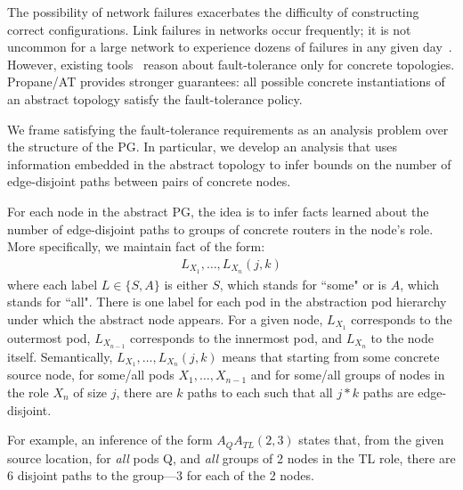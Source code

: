 \documentclass[numbers, 10pt, preprint]{sigplanconf}
\newcommand{\sysname}{{\text{}\small \sf Propane/AT}\xspace}
\begin{document}

The possibility of network failures exacerbates the difficulty of constructing correct configurations.
Link failures in networks occur frequently; it is not uncommon for a large network to experience dozens of failures in any given day~\cite{dc-failure-study}. However, existing tools~\cite{condor,propane} reason about fault-tolerance only for concrete topologies. \sysname provides stronger guarantees: all possible concrete instantiations of an abstract topology satisfy the fault-tolerance policy.


%
We frame satisfying the fault-tolerance requirements as an analysis problem over the structure of the PG. In particular, we develop an analysis that uses information embedded in the abstract topology to infer bounds on the number of edge-disjoint paths between pairs of concrete nodes.

%
For each node in the abstract PG,
the idea is to infer facts learned about the number of edge-disjoint paths
to groups of concrete routers in the node's role.
More specifically, we maintain fact of the form:
%
\[ \begin{array}{c}
  L_{X_1}, \ldots, L_{X_n}(j,k)
\end{array} \]
\noindent
%
where each label $L \in \{S,A\}$ is either $S$, which stands for ``some" or is $A$, which stands for ``all". There is one label for each pod in the abstraction pod hierarchy under which the abstract node appears. For a given node, $L_{X_1}$ corresponds to the outermost pod, $L_{X_{n-1}}$ corresponds to the innermost pod, and $L_{X_n}$ to the node itself.
Semantically, $L_{X_1}, \ldots, L_{X_n}(j,k)$ means that starting from some concrete source node, for some/all pods $X_1, \ldots, X_{n-1}$
and for some/all groups of nodes in the role $X_n$ of size $j$,
there are $k$ paths to each such that all $j*k$ paths are edge-disjoint.

For example,
an inference of the form $A_{Q} A_{TL}(2,3)$ states that, from the given source location, for \emph{all} pods Q, and \emph{all} groups of 2 nodes in the TL role, there are 6 disjoint paths to the group---3 for each of the 2 nodes.
\end{document}
